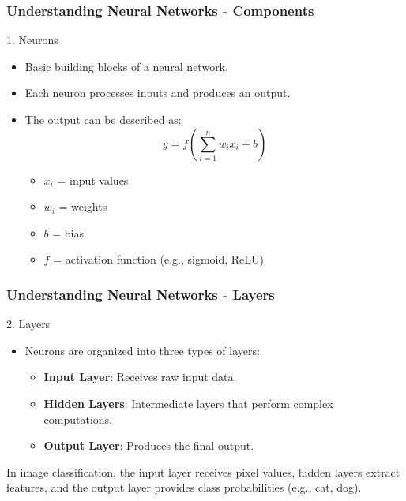 \documentclass{beamer}
\begin{document}
\begin{frame}[fragile]
    \frametitle{Understanding Neural Networks - Components}
    \begin{block}{1. Neurons}
        \begin{itemize}
            \item Basic building blocks of a neural network.
            \item Each neuron processes inputs and produces an output.
            \item The output can be described as:
            \[
            y = f\left(\sum_{i=1}^{n} w_i x_i + b\right)
            \]
            \begin{itemize}
                \item \( x_i \) = input values
                \item \( w_i \) = weights
                \item \( b \) = bias
                \item \( f \) = activation function (e.g., sigmoid, ReLU)
            \end{itemize}
        \end{itemize}
    \end{block}
\end{frame}

\begin{frame}[fragile]
    \frametitle{Understanding Neural Networks - Layers}
    \begin{block}{2. Layers}
        \begin{itemize}
            \item Neurons are organized into three types of layers:
            \begin{itemize}
                \item \textbf{Input Layer}: Receives raw input data.
                \item \textbf{Hidden Layers}: Intermediate layers that perform complex computations.
                \item \textbf{Output Layer}: Produces the final output.
            \end{itemize}
        \end{itemize}
        \begin{example}
            In image classification, the input layer receives pixel values, hidden layers extract features, and the output layer provides class probabilities (e.g., cat, dog).
        \end{example}
    \end{block}
\end{frame}
\end{document}
